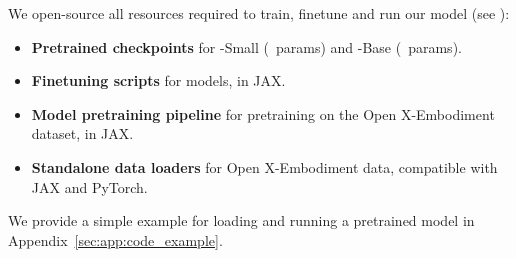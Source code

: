 We open-source all resources required to train, finetune and run our model (see \website):
\begin{itemize}
    \item \textbf{Pretrained \method{} checkpoints} for \method-Small (\smallnparams{}~params) and \method-Base (\largenparams{}~params). %
    \item \textbf{Finetuning scripts} for \method{} models, in JAX.
    \item \textbf{Model pretraining pipeline} for \method{} pretraining on the Open X-Embodiment dataset, in JAX.
    \item \textbf{Standalone data loaders} for Open X-Embodiment data, compatible with JAX and PyTorch.
\end{itemize}
We provide a simple example for loading and running a pretrained \method{} model in Appendix~\ref{sec:app:code_example}.
